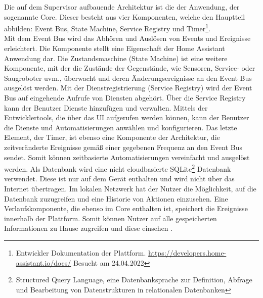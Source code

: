     Die auf dem Supervisor aufbauende Architektur ist die der Anwendung, der sogenannte Core. Dieser besteht aus vier 
    Komponenten, welche den Hauptteil abbilden: Event Bus, State Machine, Service Registry und Timer\footnote{Entwickler Dokumentation der Plattform. \url{https://developers.home-assistant.io/docs/} Besucht am 24.04.2022}. 
    \\
    Mit dem Event Bus wird das Abhören und Auslösen von Events und Ereignisse erleichtert. Die Komponente stellt eine Eigenschaft 
    der Home Assistant Anwendung dar. Die Zustandsmaschine (State Machine) ist eine weitere Komponente, mit der die Zustände der Gegenstände, wie  
    Sensoren, Service- oder Saugroboter uvm., überwacht und deren Änderungsereignisse an den Event Bus ausgelöst werden. 
    Mit der Dienstregistrierung (Service Registry) wird der Event Bus auf eingehende Aufrufe von 
    Diensten abgehört. Über die Service Registry kann der Benutzer Dienste hinzufügen und verwalten. Mittels der Entwicklertools, die über das 
    \ac{UI} aufgerufen werden können, kann der Benutzer die Dienste und Automatisierungen anwählen und konfigurieren. Das letzte 
    Element, der Timer, ist ebenso eine Komponente der Architektur, die zeitveränderte Ereignisse gemäß einer gegebenen Frequenz 
    an den Event Bus sendet. Somit können zeitbasierte Automatisierungen vereinfacht und ausgelöst werden. Als Datenbank wird eine 
    nicht cloudbasierte SQLite\footnote{Structured Query Language, eine Datenbanksprache zur Definition, Abfrage und Bearbeitung von Datenstrukturen in relationalen Datenbanken} 
    Datenbank verwendet. Diese ist nur auf dem Gerät enthalten und wird nicht über das Internet übertragen. 
    Im lokalen Netzwerk hat der Nutzer die Möglichkeit, auf die Datenbank zuzugreifen und eine Historie von Aktionen einzusehen. 
    Eine Verlaufskomponente, die ebenso im Core enthalten ist, speichert die Ereignisse innerhalb der Plattform. Somit können Nutzer auf 
    alle gespeicherten Informationen zu Hause zugreifen und diese einsehen \cite{HAOSarchitecture2018}.
    \\
    \linebreak
